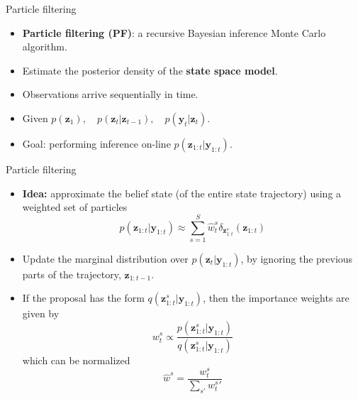 \documentclass[10pt,mathserif]{beamer}
\begin{document}
\begin{frame}{Particle filtering}
\begin{itemize}
    \item \textbf{Particle filtering (PF)}: a recursive Bayesian inference Monte Carlo algorithm.
    \item Estimate the posterior density of the \textbf{state space model}.
    \item Observations arrive sequentially in time.
    \item Given $p(\bm{z}_1), \quad p(\bm{z}_t|\bm{z}_{t-1}), \quad  p(\bm{y}_t|\bm{z}_t)$.
    \item Goal: performing inference on-line $p(\bm{z}_{1:t}|\bm{y}_{1:t})$.
\end{itemize}    
\end{frame}

\begin{frame}{Particle filtering}
\begin{itemize}
    \item \textbf{Idea:} approximate the belief state (of the entire state trajectory) using a weighted set of particles
    \begin{equation*} 
        p(\bm{z}_{1:t}|\bm{y}_{1:t}) \approx \sum_{s=1}^S{\hat{w}}^s_t\delta_{\bm{z}_{1:t}^s}(\bm{z}_{1:t})
    \end{equation*} 
    \item Update the marginal distribution over $p(\bm{z}_t|\bm{y}_{1:t})$, by ignoring the previous parts of the trajectory, $\bm{z}_{1:t-1}$.
    \item If the proposal has the form $q(\bm{z}_{1:t}^s|\bm{y}_{1:t})$, then the importance weights are given by
    \begin{equation*} 
        w_t^s\propto\frac{p(\bm{z}_{1:t}^s|\bm{y}_{1:t})}{q(\bm{z}_{1:t}^s|\bm{y}_{1:t})}
    \end{equation*} 
    which can be normalized
    \begin{equation*} 
        {\hat{w}}^s = \frac{w_t^s}{\sum_{s'}{w_t^s}'}
    \end{equation*} 
\end{itemize}    
\end{frame}
\end{document}
